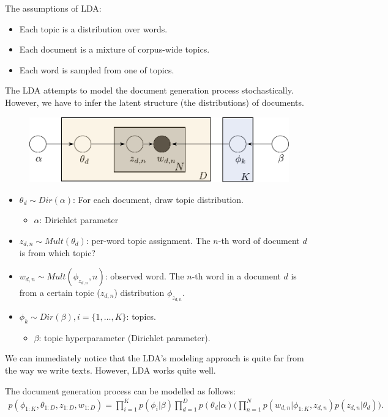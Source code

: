 The assumptions of LDA:
\begin{itemize}
	\item Each topic is a distribution over words.
	\item Each document is a mixture of corpus-wide topics.
	\item Each word is sampled from one of topics. 
\end{itemize}
The LDA attempts to model the document generation process stochastically. However, we have to infer the latent structure (the distributions) of documents. 


\begin{figure}[h]
	\centering
	\includegraphics[scale=1.0]{./images/lda/lda.pdf}
\end{figure}
\begin{itemize}
	\item $\theta_d\sim Dir(\alpha)$: For each document, draw topic distribution. 
		\begin{itemize}
			\item $\alpha$: Dirichlet parameter
		\end{itemize}
	\item $z_{d,n}\sim Mult(\theta_d)$: per-word topic assignment. The $n$-th word of document $d$ is from which topic?
	\item $w_{d,n}\sim Mult(\phi_{z_{d,n}},n)$: observed word. The $n$-th word in a document $d$ is from a certain topic ($z_{d,n}$) distribution $\phi_{z_{d,n}}$.
	\item $\phi_k\sim Dir(\beta), i=\{1,\dots,K\}$: topics.
		\begin{itemize}
			\item $\beta$: topic hyperparameter (Dirichlet parameter).
		\end{itemize}
\end{itemize}
We can immediately notice that the LDA's modeling approach is quite far from the way we write texts. However, LDA works quite well. 

The document generation process can be modelled as follows:
\begin{align*}
	p(\phi_{1:K}, \theta_{1:D}, z_{1:D}, w_{1:D}) = \prod_{i=1}^K p(\phi_i|\beta)\prod_{d=1}^D p(\theta_d|\alpha)\Bigg(\prod_{n=1}^N p(w_{d,n}|\phi_{1:K},z_{d,n})p(z_{d,n}|\theta_d)\Bigg).
\end{align*}

